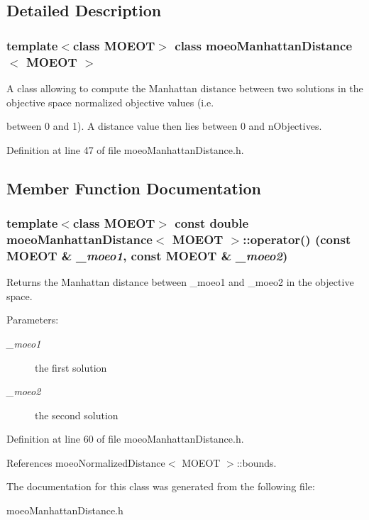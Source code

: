 \subsection{Detailed Description}
\subsubsection*{template$<$class MOEOT$>$ class moeo\-Manhattan\-Distance$<$ MOEOT $>$}

A class allowing to compute the Manhattan distance between two solutions in the objective space normalized objective values (i.e. 

between 0 and 1). A distance value then lies between 0 and n\-Objectives. 



Definition at line 47 of file moeo\-Manhattan\-Distance.h.

\subsection{Member Function Documentation}
\subsubsection{\setlength{\rightskip}{0pt plus 5cm}template$<$class MOEOT$>$ const double \bf{moeo\-Manhattan\-Distance}$<$ MOEOT $>$::operator() (const MOEOT \& {\em \_\-moeo1}, const MOEOT \& {\em \_\-moeo2})\hspace{0.3cm}{\tt  [inline]}}\label{classmoeoManhattanDistance_dcabb2bddb46439a47cd1af5dd124f92}


Returns the Manhattan distance between \_\-moeo1 and \_\-moeo2 in the objective space. 

\begin{Desc}
\item[Parameters:]
\begin{description}
\item[{\em \_\-moeo1}]the first solution \item[{\em \_\-moeo2}]the second solution \end{description}
\end{Desc}


Definition at line 60 of file moeo\-Manhattan\-Distance.h.

References moeo\-Normalized\-Distance$<$ MOEOT $>$::bounds.

The documentation for this class was generated from the following file:\begin{CompactItemize}
\item 
moeo\-Manhattan\-Distance.h\end{CompactItemize}
